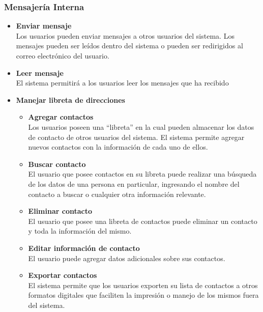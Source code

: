 \subsubsection{Mensajería Interna}
\begin{itemize}
	\item \textbf{Enviar mensaje}\\
	Los usuarios pueden enviar mensajes a otros usuarios del sistema. Los mensajes pueden ser leídos dentro del sistema o pueden ser redirigidos al correo electrónico del usuario.
	\item \textbf{Leer mensaje}\\
	El sistema permitirá a los usuarios leer los mensajes que ha recibido
 	\item \textbf{Manejar libreta de direcciones}
	\begin{itemize}
		\item \textbf{Agregar contactos}\\
		Los usuarios poseen una ``libreta'' en la cual pueden almacenar los datos de contacto de otros usuarios del sistema. El sistema permite agregar nuevos contactos con la información de cada uno de ellos.
		\item \textbf{Buscar contacto}\\
		El usuario que posee contactos en su libreta puede realizar una búsqueda de los datos de una persona en particular, ingresando el nombre del contacto a buscar o cualquier otra información relevante.
		\item \textbf{Eliminar contacto}\\
		El usuario que posee una libreta de contactos puede eliminar un contacto y toda la información del mismo.
		\item \textbf{Editar información de contacto}\\
		El usuario puede agregar datos adicionales sobre sus contactos.
		\item \textbf{Exportar contactos}\\
		El sistema permite que los usuarios exporten su lista de contactos a otros formatos digitales que faciliten la impresión o manejo de los mismos fuera del sistema.
	\end{itemize}
\end{itemize}

